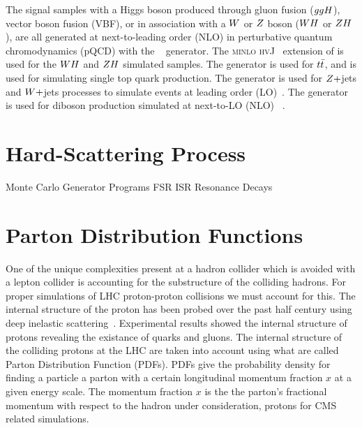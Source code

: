 The signal samples with a Higgs boson produced through gluon fusion ($ggH$), vector boson fusion (VBF),
or in association with a $W$ or $Z$ boson ($WH$ or $ZH$), are all
generated at next-to-leading order (NLO) in perturbative quantum chromodynamics 
(pQCD) with the 
~\cite{Nason:2004rx,Frixione:2007vw, Alioli:2010xd, Alioli:2010xa, Alioli:2008tz} 
generator. The \textsc{minlo hvJ}~\cite{Luisoni:2013kna} extension of  
is used for the $WH$ and $ZH$ simulated samples. 
The  generator is used for $t\bar{t}$, and  is used for simulating 
single top quark production.
The \MGAMCNLO generator is used for $Z+$jets and $W+$jets 
processes to simulate events at leading order (LO)~\cite{Alwall:2007fs}.
The \MGAMCNLO generator is used for diboson production simulated at next-to-LO (NLO) 
~\cite{Frederix:2012ps}.



\section{Hard-Scattering Process}
Monte Carlo Generator Programs
FSR ISR
    Resonance Decays



\section{Parton Distribution Functions}
One of the unique complexities present at a hadron collider which is avoided with a
lepton collider is accounting for the substructure of the colliding hadrons. For proper simulations
of LHC proton-proton collisions we must account for this. The internal structure of the proton
has been probed over the past half century using deep inelastic scattering~\cite{Breidenbach:1969kd, PhysRevLett.23.930}.
Experimental results showed the internal structure of protons revealing the existance of
quarks and gluons. The internal structure of the colliding protons at the LHC are taken into
account using what are called Parton Distribution Function (PDFs). PDFs give the probability
density for finding a particle a parton with a certain longitudinal momentum fraction $x$ at a given
energy scale. The momentum fraction $x$ is the the parton's fractional momentum with respect
to the hadron under consideration, protons for CMS related simulations. 

